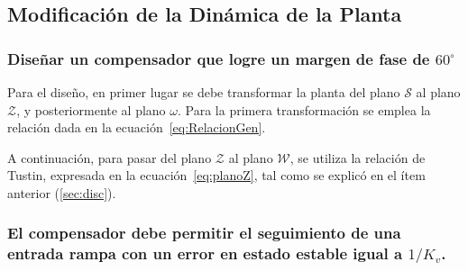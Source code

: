 \subsection{Modificación de la Dinámica de la Planta}
\subsubsection{Diseñar un compensador que logre un margen de fase de $60^\circ$} 

Para el diseño, en primer lugar se debe transformar la planta del plano $\mathcal{S}$ al plano $\mathcal{Z}$, y posteriormente al plano $\mathcal{\omega}$. Para la primera transformación se emplea la relación dada en la ecuación~\ref{eq:RelacionGen}.  

A continuación, para pasar del plano $\mathcal{Z}$ al plano $\mathcal{W}$, se utiliza la relación de Tustin, expresada en la ecuación~\ref{eq:planoZ}, tal como se explicó en el ítem anterior (\ref{sec:disc}).


\subsubsection{El compensador debe permitir el seguimiento de una entrada rampa con un error en estado estable igual a $1/K_v$.}
